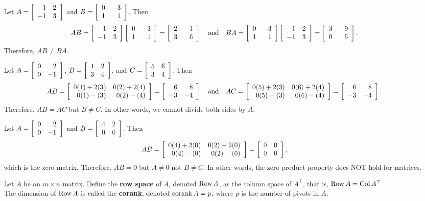 \begin{Exam} Let $A = \mtx{rr}{1 & 2\\-1&3}$ and $B = \mtx{rr}{0&-3\\1&1}$. Then 
\[AB = \mtx{rr}{1 & 2\\-1&3}\mtx{rr}{0&-3\\1&1} = \mtx{rr}{2&-1\\3&6}\quad\text{and}\quad BA = \mtx{rr}{0&-3\\1&1}\mtx{rr}{1 & 2\\-1&3} = \mtx{rr}{3&-9\\0&5}.\] Therefore, $AB\neq BA$.
\end{Exam}\vs

\begin{Exam} Let $A = \mtx{rr}{0&2\\0&-1}$, $B = \mtx{rr}{1&2\\3&4}$, and $C = \mtx{rr}{5&6\\3&4}$. Then 
\[AB = \mtx{rr}{0(1)+2(3)& 0(2)+2(4)\\ 0(1)-(3)& 0(2)-(4)} = \mtx{rr}{6&8\\-3&-4} \quad\text{and}\quad AC = \mtx{rr}{0(5)+2(3)& 0(6)+2(4)\\ 0(5)-(3)& 0(6)-(4)} = \mtx{rr}{6&8\\-3&-4}.\] Therefore, $AB=AC$ but $B\neq C$. In other words, we cannot divide both sides by $A$.
\end{Exam}\vs

\begin{Exam} Let $A = \mtx{rr}{0&2\\0&-1}$ and $B = \mtx{rr}{4&2\\0&0}$. Then
\[AB = \mtx{rr}{0(4)+2(0)& 0(2)+2(0)\\ 0(4)-(0)& 0(2)-(0)} = \mtx{rr}{0&0\\0&0},\] which is the zero matrix. Therefore, $AB=0$ but $A\neq 0$ not $B\neq C$. In other words, the zero product property does NOT hold for matrices.
\end{Exam}\vs

\begin{Def} Let $A$ be an $m\times n$ matrix. Define the \textbf{row space} of $A$, denoted $\row A$, as the column space of $A^\top $, that is, $\row A = \col A^\top $. \\

The dimension of $\row A$ is called the \textbf{corank}, denoted $\corank A = p$, where $p$ is the number of pivots in $A$. 
\end{Def}\vs

